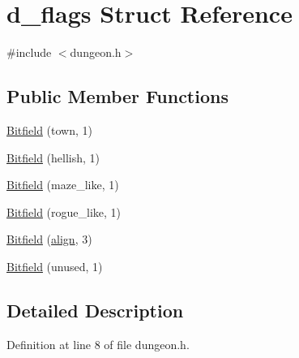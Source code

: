 \hypertarget{structd__flags}{\section{d\+\_\+flags Struct Reference}
\label{structd__flags}
}


{\ttfamily \#include $<$dungeon.\+h$>$}

\subsection*{Public Member Functions}
\begin{DoxyCompactItemize}
\item 
\hyperlink{structd__flags_a4659e0e0388e3f31e01d1db7822328ff}{Bitfield} (town, 1)
\item 
\hyperlink{structd__flags_a1b4ce9ca10d55d139dc263871f17fb85}{Bitfield} (hellish, 1)
\item 
\hyperlink{structd__flags_aed8aca86d397af5b183a59629d2b9d43}{Bitfield} (maze\+\_\+like, 1)
\item 
\hyperlink{structd__flags_a0ccb6e4e5ae70ac235e0e46e38a3caf5}{Bitfield} (rogue\+\_\+like, 1)
\item 
\hyperlink{structd__flags_abc3e972edb449715db36185c6e4a8afb}{Bitfield} (\hyperlink{structalign}{align}, 3)
\item 
\hyperlink{structd__flags_ae2d937789ac9e68dfe88e072de4b4b0c}{Bitfield} (unused, 1)
\end{DoxyCompactItemize}


\subsection{Detailed Description}


Definition at line 8 of file dungeon.\+h.



